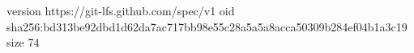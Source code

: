 version https://git-lfs.github.com/spec/v1
oid sha256:bd313be92dbd1d62da7ac717bb98e55c28a5a5a8acca50309b284ef04b1a3c19
size 74
